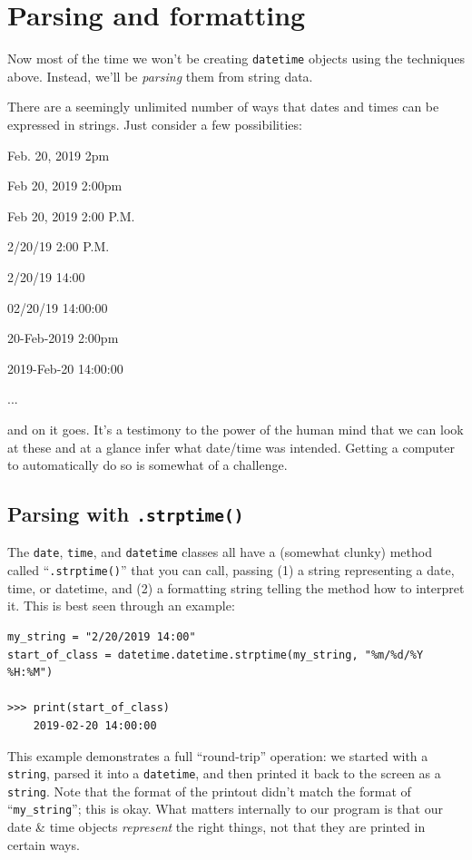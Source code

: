 \section{Parsing and formatting}

Now most of the time we won't be creating \texttt{datetime} objects using the
techniques above. Instead, we'll be \textit{parsing} them from string data.

There are a seemingly unlimited number of ways that dates and times can be
expressed in strings. Just consider a few possibilities:

\small
\begin{compactitem}
\item Feb. 20, 2019 2pm
\item Feb 20, 2019 2:00pm
\item Feb 20, 2019 2:00 P.M.
\item 2/20/19 2:00 P.M.
\item 2/20/19 14:00
\item 02/20/19 14:00:00
\item 20-Feb-2019 2:00pm
\item 2019-Feb-20 14:00:00
\item ...
\end{compactitem}
\normalsize

and on it goes. It's a testimony to the power of the human mind that we can
look at these and at a glance infer what date/time was intended. Getting a
computer to automatically do so is somewhat of a challenge.

\subsection{Parsing with \texttt{.strptime()}}

The \texttt{date}, \texttt{time}, and \texttt{datetime} classes all have a
(somewhat clunky) method called ``\texttt{.strptime()}'' that you can call,
passing (1) a string representing a date, time, or datetime, and (2) a
formatting string telling the method how to interpret it. This is best seen
through an example:

\begin{Verbatim}[fontsize=\small,samepage=true,frame=single]
my_string = "2/20/2019 14:00"
start_of_class = datetime.datetime.strptime(my_string, "%m/%d/%Y %H:%M")

>>> print(start_of_class)
    2019-02-20 14:00:00
\end{Verbatim}

This example demonstrates a full ``round-trip'' operation: we started with a
\texttt{string}, parsed it into a \texttt{datetime}, and then printed it back
to the screen as a \texttt{string}. Note that the format of the printout
didn't match the format of ``\texttt{my\_string}''; this is okay. What matters
internally to our program is that our date \& time objects \textit{represent}
the right things, not that they are printed in certain ways.

